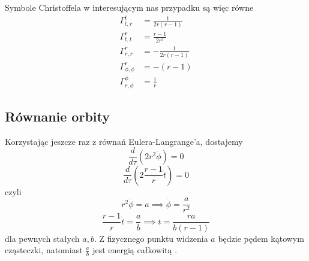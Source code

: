 Symbole Christoffela w interesującym nas przypadku są więc równe
\begin{align*}
  \Gamma_{t,r}^t&=\frac{1}{2r(r-1)}\\ 
  \Gamma_{t,t}^r&=\frac{r-1}{2r^3}\\ 
  \Gamma_{r,r}^r&=-\frac{1}{2r(r-1)}\\ 
  \Gamma_{\phi,\phi}^r&=-(r-1)\\ 
  \Gamma_{r,\phi}^\phi&=\frac{1}{r} 
\end{align*}

\subsection{Równanie orbity}

Korzystając jeszcze raz z równań Eulera-Langrange'a, dostajemy
$$ \frac{d}{d\tau}(2r^2\dot{\phi})=0 $$
$$ \frac{d}{d\tau}\left(2\frac{r-1}{r}\dot{t}\right)=0 $$
czyli 
$$ r^2\dot{\phi}=a \implies \dot{\phi}=\frac{a}{r^2}$$
$$ \frac{r-1}{r}\dot{t}=\frac{a}{b} \implies \dot{t}=\frac{ra}{b(r-1)}$$
dla pewnych stałych $a,b$. Z fizycznego punktu widzenia $a$ będzie pędem kątowym cząsteczki, natomiast $\frac{a}{b}$ jest energią całkowitą \cite{kolejnaFizyka}. 

%

